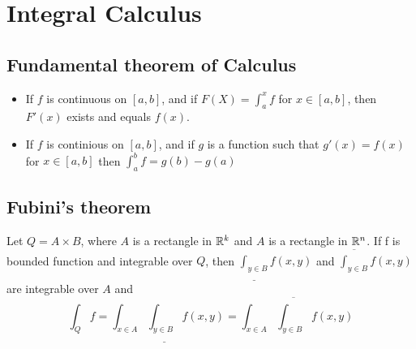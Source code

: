 \section{Integral Calculus}

\subsection{Fundamental theorem of Calculus}
\begin{itemize}
\item
	If $f$ is continuous on $[a, b]$, and if $F(X)=\int_a^x f$
	for $x\in[a,b]$, then $F'(x)$ exists and equals $f(x)$.
\item
	If $f$ is continious on $[a, b]$,
	and if $g$ is a function such that
	$g'(x)=f(x)$ for $x\in[a,b]$ then $\int_a^b f = g(b) - g(a)$
\end{itemize}


\subsection{Fubini's theorem}
Let $Q=A\times B$, where $A$ is a rectangle in ${\mathbb R}^k$ and $A$ is a rectangle in ${\mathbb R}^n$.
If f is bounded function and integrable over $Q$, then
$\underline{\int_{y\in B}} f(x,y)$ and $\overline{\int_{y\in B}} f(x,y)$ are integrable over $A$
and
\[\int_Q f = \int_{x\in A}\underline{\int_{y\in B}} f(x,y) = \int_{x\in A}\overline{\int_{y\in B}} f(x,y)\]
